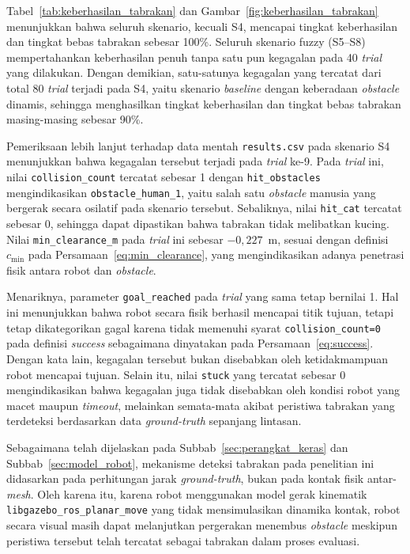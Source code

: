 Tabel~\ref{tab:keberhasilan_tabrakan} dan Gambar~\ref{fig:keberhasilan_tabrakan} menunjukkan bahwa seluruh skenario, kecuali S4, mencapai tingkat keberhasilan dan tingkat bebas tabrakan sebesar 100\%. Seluruh skenario fuzzy (S5--S8) mempertahankan keberhasilan penuh tanpa satu pun kegagalan pada 40 \textit{trial} yang dilakukan. Dengan demikian, satu-satunya kegagalan yang tercatat dari total 80 \textit{trial} terjadi pada S4, yaitu skenario \textit{baseline} dengan keberadaan \textit{obstacle} dinamis, sehingga menghasilkan tingkat keberhasilan dan tingkat bebas tabrakan masing-masing sebesar 90\%.

Pemeriksaan lebih lanjut terhadap data mentah \texttt{results.csv} pada skenario S4 menunjukkan bahwa kegagalan tersebut terjadi pada \textit{trial} ke-9. Pada \textit{trial} ini, nilai \texttt{collision\_count} tercatat sebesar 1 dengan \texttt{hit\_obstacles} mengindikasikan \texttt{obstacle\_human\_1}, yaitu salah satu \textit{obstacle} manusia yang bergerak secara osilatif pada skenario tersebut. Sebaliknya, nilai \texttt{hit\_cat} tercatat sebesar 0, sehingga dapat dipastikan bahwa tabrakan tidak melibatkan kucing. Nilai \texttt{min\_clearance\_m} pada \textit{trial} ini sebesar $-0{,}227$~m, sesuai dengan definisi $c_\text{min}$ pada Persamaan~\ref{eq:min_clearance}, yang mengindikasikan adanya penetrasi fisik antara robot dan \textit{obstacle}.

Menariknya, parameter \texttt{goal\_reached} pada \textit{trial} yang sama tetap bernilai 1. Hal ini menunjukkan bahwa robot secara fisik berhasil mencapai titik tujuan, tetapi tetap dikategorikan gagal karena tidak memenuhi syarat \texttt{collision\_count=0} pada definisi \textit{success} sebagaimana dinyatakan pada Persamaan~\ref{eq:success}. Dengan kata lain, kegagalan tersebut bukan disebabkan oleh ketidakmampuan robot mencapai tujuan. Selain itu, nilai \texttt{stuck} yang tercatat sebesar 0 mengindikasikan bahwa kegagalan juga tidak disebabkan oleh kondisi robot yang macet maupun \textit{timeout}, melainkan semata-mata akibat peristiwa tabrakan yang terdeteksi berdasarkan data \textit{ground-truth} sepanjang lintasan.

Sebagaimana telah dijelaskan pada Subbab~\ref{sec:perangkat_keras} dan Subbab~\ref{sec:model_robot}, mekanisme deteksi tabrakan pada penelitian ini didasarkan pada perhitungan jarak \textit{ground-truth}, bukan pada kontak fisik antar-\textit{mesh}. Oleh karena itu, karena robot menggunakan model gerak kinematik \texttt{libgazebo\_ros\_planar\_move} yang tidak mensimulasikan dinamika kontak, robot secara visual masih dapat melanjutkan pergerakan menembus \textit{obstacle} meskipun peristiwa tersebut telah tercatat sebagai tabrakan dalam proses evaluasi.

